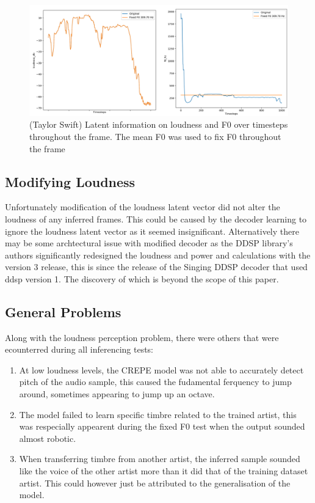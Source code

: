 \begin{figure}
    \centering
    \includegraphics[width=\textwidth]{research/results/TaylorSwift/FixedF0Graphs.png}
    \caption{(Taylor Swift) Latent information on loudness and F0 over timesteps throughout the frame. The mean F0 was used to fix F0 throughout the frame}
\end{figure}

\subsection{Modifying Loudness}

Unfortunately modification of the loudness latent vector did not alter the loudness of any inferred frames. This could be caused by the decoder learning to ignore the loudness latent vector as it seemed insignificant. Alternatively there may be some archtectural issue with modified decoder as the DDSP library's authors significantly redesigned the loudness and power and calculations with the version 3 release, this is since the release of the Singing DDSP decoder that used ddsp version 1. The discovery of which is beyond the scope of this paper.

\subsection{General Problems}

Along with the loudness perception problem, there were others that were ecounterred during all inferencing tests:

\begin{enumerate}
    \item At low loudness levels, the CREPE model was not able to accurately detect pitch of the audio sample, this caused the fudamental ferquency to jump around, sometimes appearing to jump up an octave.
    \item The model failed to learn specific timbre related to the trained artist, this was respecially appearent during the fixed F0 test when the output sounded almost robotic.
    \item When transferring timbre from another artist, the inferred sample sounded like the voice of the other artist more than it did that of the training dataset artist. This could however just be attributed to the generalisation of the model.
\end{enumerate}